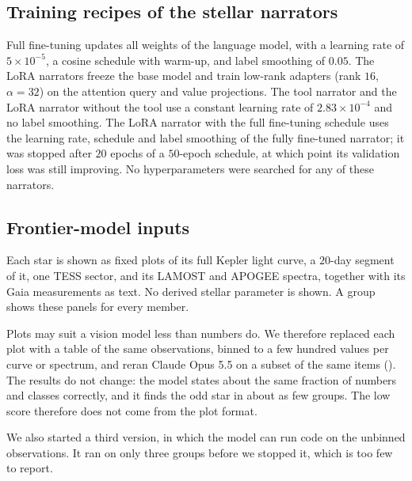 \subsection{Training recipes of the stellar narrators}\label{app:recipes}
Full fine-tuning updates all weights of the language model, with a learning rate of
$5\times10^{-5}$, a cosine schedule with warm-up, and label smoothing of $0.05$. The LoRA
narrators freeze the base model and train low-rank adapters (rank $16$, $\alpha=32$) on the
attention query and value projections. The tool narrator and the LoRA narrator without the
tool use a constant learning rate of $2.83\times10^{-4}$ and no label smoothing. The LoRA
narrator with the full fine-tuning schedule uses the learning rate, schedule and label
smoothing of the fully fine-tuned narrator; it was stopped after $20$ epochs of a $50$-epoch
schedule, at which point its validation loss was still improving. No hyperparameters were
searched for any of these narrators.

\subsection{Frontier-model inputs}\label{app:frontier}
Each star is shown as fixed plots of its full Kepler light curve, a $20$-day segment of it,
one TESS sector, and its LAMOST and APOGEE spectra, together with its Gaia measurements as
text. No derived stellar parameter is shown. A group shows these panels for every member.

Plots may suit a vision model less than numbers do. We therefore replaced each plot with a
table of the same observations, binned to a few hundred values per curve or spectrum, and
reran Claude Opus 5.5 on a subset of the same items (). The results do
not change: the model states about the same fraction of numbers and classes correctly, and
it finds the odd star in about as few groups. The low score therefore does not come from the
plot format.

We also started a third version, in which the model can run code on the unbinned
observations. It ran on only three groups before we stopped it, which is too few to report.


